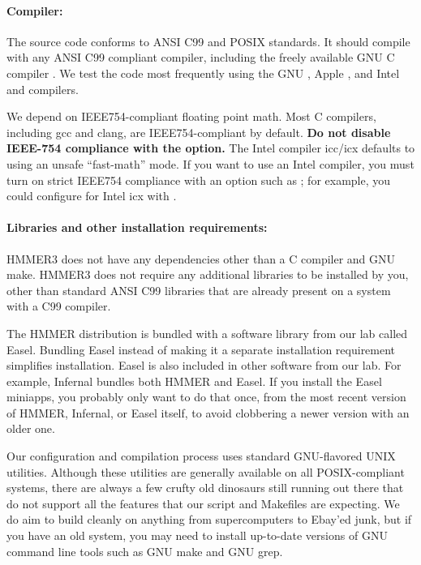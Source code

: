 \paragraph{Compiler:} The source code conforms to ANSI
C99 and POSIX standards. It should compile with any ANSI C99 compliant
compiler, including the freely available GNU C compiler .
We test the code most frequently using the GNU , Apple
, and Intel  and 
compilers.

We depend on IEEE754-compliant floating point math.  Most C compilers,
including gcc and clang, are IEEE754-compliant by default. \textbf{Do
  not disable IEEE-754 compliance with the  option.} The Intel compiler icc/icx
defaults to using an unsafe ``fast-math'' mode. If you want to use an
Intel compiler, you must turn on strict IEEE754 compliance with an option
such as ; for example, you could configure for
Intel icx with .


\paragraph{Libraries and other installation requirements:}
HMMER3 does not have any dependencies other than a C compiler and GNU
make. HMMER3 does not require any additional libraries to be installed
by you, other than standard ANSI C99 libraries that are already
present on a system with a C99 compiler.

The HMMER distribution is bundled with a software library from our lab
called Easel.
Bundling Easel instead of making it a separate installation
requirement simplifies installation. Easel is also included in other
software from our lab. For example,
Infernal
bundles both HMMER and Easel. If you install the Easel miniapps, you
probably only want to do that once, from the most recent version of
HMMER, Infernal, or Easel itself, to avoid clobbering a newer version
with an older one.

Our configuration and compilation process uses standard GNU-flavored
UNIX utilities. Although these utilities are generally available on
all POSIX-compliant systems, there are always a few crufty old
dinosaurs still running out there that do not support all the features
that our  script and Makefiles are expecting. We do
aim to build cleanly on anything from supercomputers to Ebay'ed junk,
but if you have an old system, you may need to install up-to-date
versions of GNU command line tools such as GNU make and GNU grep.

